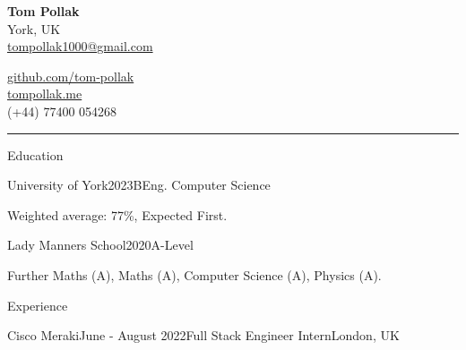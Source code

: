 \documentclass{structure}
\begin{document}
\parbox{0.5\textwidth}{ 
{\namesize\bf{Tom Pollak}} \\[6pt]
York, UK\\ 
\href{mailto:tompollak1000@gmail.com}{tompollak1000@gmail.com}
}
\hfill 
\parbox{0.5\textwidth}{ 
\vspace*{10pt}

\begin{flushright}

\href{https://github.com/tom-pollak}{github.com/tom-pollak} \\
\href{https://tompollak.me}{tompollak.me} \\
(+44) 77400 054268
\end{flushright}

}

\smallskip
\hrule
\smallskip

\begin{rSection}{Education}

\begin{rSubsection}{University of York}{2023}{BEng. Computer Science}{}{}
    \item Weighted average: 77\%, Expected First.
\end{rSubsection}

\begin{rSubsection}{Lady Manners School}{2020}{A-Level}{}{}
    \item Further Maths (A), Maths (A), Computer Science (A), Physics (A).
\end{rSubsection}
\end{rSection}


\begin{rSection}{Experience}

\begin{rSubsection}{Cisco Meraki}{June - August 2022}{Full Stack Engineer Intern}{London, UK}{}
    \item 
\end{rSubsection}

\end{rSection}


\end{document}
